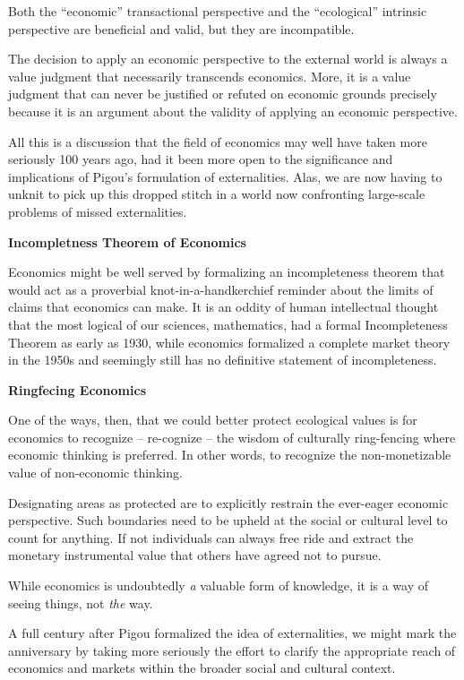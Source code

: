 \documentclass[
]{book}
\begin{document}
Both the ``economic'' transactional perspective and the ``ecological'' intrinsic perspective are
beneficial and valid, but they are incompatible.

The decision to
apply an economic perspective to the external world is always a value judgment that
necessarily transcends economics. More, it is a value judgment that can never be justified or
refuted on economic grounds precisely because it is an argument about the validity of
applying an economic perspective.

All this is a discussion that the field of economics may well have taken more seriously 100
years ago, had it been more open to the significance and implications of Pigou's formulation
of externalities. Alas, we are now having to unknit to pick up this dropped stitch in a world now
confronting large-scale problems of missed externalities.

\textbf{Incompletness Theorem of Economics}

Economics might be well served by formalizing an incompleteness theorem that would act as
a proverbial knot-in-a-handkerchief reminder about the limits of claims that economics can
make. It is an oddity of human intellectual thought that the most logical of our sciences,
mathematics, had a formal Incompleteness Theorem as early as 1930, while economics
formalized a complete market theory in the 1950s and seemingly still has no definitive
statement of incompleteness.

\textbf{Ringfecing Economics}

One of the ways, then, that we could better protect ecological values is for economics to
recognize -- re-cognize -- the wisdom of culturally ring-fencing where economic thinking is
preferred. In other words, to recognize the non-monetizable value of non-economic thinking.

Designating areas as protected are to explicitly restrain the ever-eager economic perspective.
Such boundaries need to be upheld at the social or cultural level to count for anything.
If not individuals can always free ride and extract the monetary instrumental value
that others have agreed not to pursue.

While economics is undoubtedly \emph{a} valuable form of knowledge, it is a way of seeing things,
not \emph{the} way.

A full century after Pigou formalized the idea of externalities, we might mark the
anniversary by taking more seriously the effort to clarify the appropriate reach of economics
and markets within the broader social and cultural context.
\end{document}
